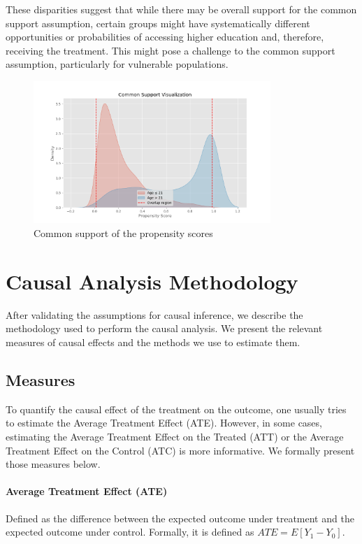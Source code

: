 \documentclass[11pt]{article}
\begin{document}
These disparities suggest that while there may be overall support for the common support assumption, certain groups might have systematically different opportunities or probabilities of accessing higher education and, therefore, receiving the treatment. This might pose a challenge to the common support assumption, particularly for vulnerable populations.


\begin{figure}
    \centering
    \caption{Common support of the propensity scores}
    \label{fig:common_support}
    \includegraphics[width = 0.8\textwidth]{plots/common_support.png}
\end{figure}



\section{Causal Analysis Methodology}

After validating the assumptions for causal inference, we describe the methodology used to perform the causal analysis. We present the relevant measures of causal effects and the methods we use to estimate them.

\subsection{Measures}

To quantify the causal effect of the treatment on the outcome, one usually tries to estimate the Average Treatment Effect (ATE). However, in some cases, estimating the Average Treatment Effect on the Treated (ATT) or the Average Treatment Effect on the Control (ATC) is more informative. We formally present those measures below.

\paragraph{Average Treatment Effect (ATE)} Defined as the difference between the expected outcome under treatment and the expected outcome under control. Formally, it is defined as $ATE = E[Y_1 - Y_0]$.
\end{document}
